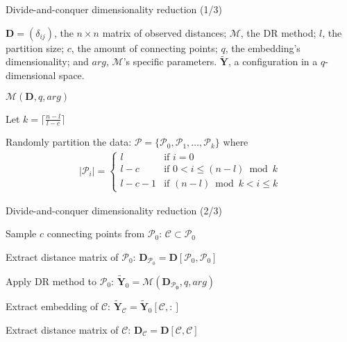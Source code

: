 \documentclass[10pt]{beamer}
\begin{document}
\begin{frame}{Divide-and-conquer dimensionality reduction (1/3)}
    \begin{algorithm}[H]
        \caption{Divide-and-conquer dimensionality reduction}
        \label{alg:DivideConquer}
        
        \begin{algorithmic}[1]
            \Require $\mathbf{D} = (\delta_{ij})$, the $n \times n$ matrix of observed distances; $\mathcal{M}$, the DR method; $l$, the partition size; $c$, the amount of connecting points; $q$, the embedding's dimensionality; and $arg$, $\mathcal{M}$'s specific parameters.
            \Ensure $\mathbf{\widetilde{Y}}$, a configuration in a $q$-dimensional space.
            
                \Return $\mathcal{M}(\mathbf{D}, q, arg)$
            \EndIf
        
            \State Let $k = \lceil \frac{n - l}{l - c} \rceil$
            
            \State Randomly partition the data: $\mathcal{P} = \{\mathcal{P}_0, \mathcal{P}_1, \ldots, \mathcal{P}_k\}$ where
            \begin{align*}
                |\mathcal{P}_i| = \begin{cases}
                l & \text{if } i = 0 \\
                l-c & \text{if } 0 < i \leq (n-l) \bmod k \\
                l-c-1 & \text{if } (n-l) \bmod k < i \leq k
                \end{cases}
            \end{align*}
        \end{algorithmic}
    \end{algorithm}
\end{frame}

\begin{frame}{Divide-and-conquer dimensionality reduction (2/3)}
    \begin{algorithm}[H]
        \begin{algorithmic}[1]
        \setcounter{ALG@line}{4}
            \State Sample $c$ connecting points from $\mathcal{P}_0$: $\mathcal{C} \subset \mathcal{P}_0$
        
            \State Extract distance matrix of $\mathcal{P}_0$: $\mathbf{D}_{\mathcal{P}_0} = \mathbf{D}[\mathcal{P}_0,\mathcal{P}_0]$
            
            \State Apply DR method to $\mathcal{P}_0$: $\mathbf{\widetilde{Y}}_0 = \mathcal{M}(\mathbf{D_{\mathcal{P}_0}}, q, arg)$
        
            \State Extract embedding of $\mathcal{C}$: $\mathbf{\widetilde{Y}}_\mathcal{C} = \mathbf{\widetilde{Y}}_0[{\mathcal{C}},:]$
        
            \State Extract distance matrix of $\mathcal{C}$: $\mathbf{D}_{\mathcal{C}} = \mathbf{D}[\mathcal{C},\mathcal{C}]$
        \end{algorithmic}
    \end{algorithm}
\end{frame}
\end{document}
